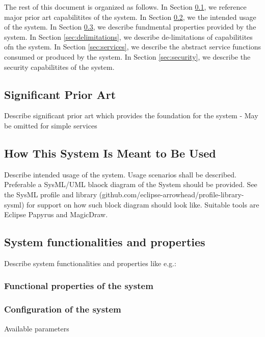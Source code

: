 \documentclass[a4paper]{arrowhead}
\begin{document}
The rest of this document is organized as follows.
In Section \ref{sec:prior_art}, we reference major prior art capabilitites
of the system.
In Section \ref{sec:use}, we the intended usage of the system.
In Section \ref{sec:properties}, we describe fundmental properties
provided by the system.
In Section \ref{sec:delimitations}, we describe de-limitations of capabilitites
ofn the system.
In Section \ref{sec:services}, we describe the abstract service
functions consumed or produced by the system.
In Section \ref{sec:security}, we describe the security capabilitites
of the system.

\newpage

\subsection{Significant Prior Art}
\label{sec:prior_art}

\color{red}
Describe significant prior art which provides the
foundation for the system - May be omitted for simple services
\color{black}  

\subsection{How This System Is Meant to Be Used}
\label{sec:use}

\color{red}
Describe intended usage of the system. Usage scenarios
shall be described. Preferable a SysML/UML blaock diagram of the
System should be provided. See the SysML profile and library
(github.com/eclipse-arrowhead/profile-library-sysml) for
support on how such block diagram should look like. Suitable tools are
Eclipse Papyrus and MagicDraw.
\color{black}  

\subsection{System functionalities and properties}
\label{sec:properties}

\color{red}
Describe system functionalities and properties like e.g.:
\subsubsection {Functional properties of the system}

\subsubsection {Configuration of the system}
Available parameters
\end{document}
